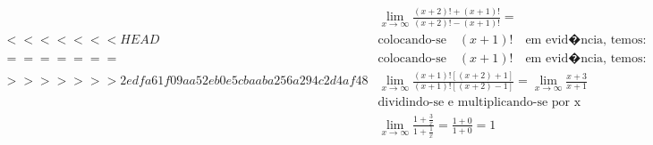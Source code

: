 \begin{ex}
\begin{align}
&\lim_{x\rightarrow \infty} \frac{(x+2)!+(x+1)!}{(x+2)!-(x+1)!}=\nonumber\\
<<<<<<< HEAD
&\text{colocando-se}\quad (x+1)!\quad\text{em evid�ncia, temos:}\nonumber\\
=======
&\text{colocando-se}\quad (x+1)!\quad\text{em evid�ncia, temos:}\nonumber\\
>>>>>>> 2edfa61f09aa52eb0e5cbaaba256a294c2d4af48
&\lim_{x\rightarrow \infty} \frac{(x+1)![(x+2)+1]}{(x+1)![(x+2)-1]}=\lim_{x\rightarrow \infty} \frac{x+3}{x+1}\nonumber\\
&\text{dividindo-se e multiplicando-se por x temos:}\nonumber\\
&\lim_{x\rightarrow \infty} \frac{1+\frac{3}{x}}{1+\frac{1}{x}}=\frac{1+0}{1+0}=1\nonumber
\end{align}
\end{ex}